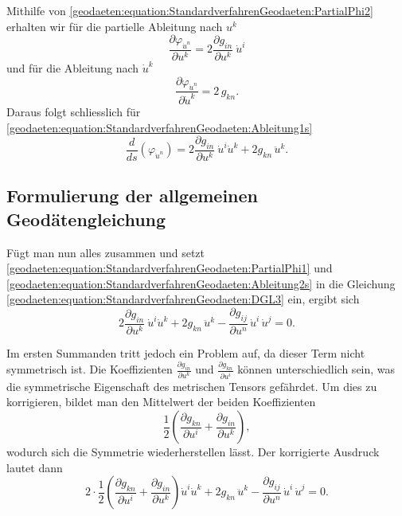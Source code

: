 Mithilfe von \eqref{geodaeten:equation:StandardverfahrenGeodaeten:PartialPhi2} erhalten wir für die partielle Ableitung nach $u^k$  
\begin{equation}
	\frac{\partial \varphi_{\dot{u}^n}}{\partial u^k} = 
	2 \frac{\partial g_{in}}{\partial u^k} \ \dot{u}^i
\end{equation}
und für die Ableitung nach $\dot{u}^k$
\begin{equation}
	\frac{\partial \varphi_{\dot{u}^n}}{\partial \dot{u}^k} = 
	2 \, g_{kn}.
\end{equation}
Daraus folgt schliesslich für \eqref{geodaeten:equation:StandardverfahrenGeodaeten:Ableitung1s}
\begin{equation}
	\frac{d}{ds} \left( \varphi_{\dot{u}^n} \right) = 2 \frac{\partial g_{in}}{\partial u^k} \ \dot{u}^i \dot{u}^k + 2 g_{kn} \, \ddot{u}^k.
	\label{geodaeten:equation:StandardverfahrenGeodaeten:Ableitung2s}
\end{equation}

\subsection{Formulierung der allgemeinen Geodätengleichung}
Fügt man nun alles zusammen und setzt \eqref{geodaeten:equation:StandardverfahrenGeodaeten:PartialPhi1} und \eqref{geodaeten:equation:StandardverfahrenGeodaeten:Ableitung2s} in die Gleichung \eqref{geodaeten:equation:StandardverfahrenGeodaeten:DGL3} ein, ergibt sich
\begin{equation}
	2 \frac{\partial g_{in}}{\partial u^k} \ \dot{u}^i \dot{u}^k + 2 g_{kn} \, \ddot{u}^k - \frac{\partial g_{i\!j}}{\partial u^n} \, \dot{u}^i \, \dot{u}^j = 0.
\end{equation}

Im ersten Summanden tritt jedoch ein Problem auf, da dieser Term nicht symmetrisch ist. 
Die Koeffizienten $\frac{\partial g_{in}}{\partial u^k}$ und $\frac{\partial g_{kn}}{\partial u^i}$ können unterschiedlich sein, was die symmetrische Eigenschaft des metrischen Tensors gefährdet. 
Um dies zu korrigieren, bildet man den Mittelwert der beiden Koeffizienten
\begin{equation}
	\frac{1}{2} \left( \frac{\partial g_{kn}}{\partial u^i} + \frac{\partial g_{in}}{\partial u^k} \right),
\end{equation}
wodurch sich die Symmetrie wiederherstellen lässt.
Der korrigierte Ausdruck lautet dann
\begin{equation}
	2 \cdot \frac{1}{2} \left( \frac{\partial g_{kn}}{\partial u^i} + \frac{\partial g_{in}}{\partial u^k} \right) \dot{u}^i \dot{u}^k + 2 g_{kn} \, \ddot{u}^k - \frac{\partial g_{i\!j}}{\partial u^n} \, \dot{u}^i \, \dot{u}^j = 0.
\end{equation}

